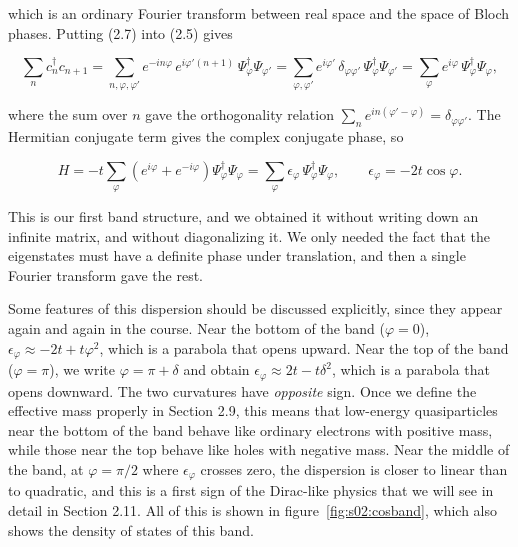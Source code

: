 which is an ordinary Fourier transform between real space and the space of Bloch phases. Putting (2.7) into (2.5) gives

\begin{equation*}\sum_n c_n^\dagger c_{n+1} = \sum_{n,\varphi,\varphi'} e^{-in\varphi}\,e^{i\varphi'(n+1)}\,
\Psi_\varphi^\dagger \Psi_{\varphi'} = \sum_{\varphi,\varphi'} e^{i\varphi'}\,\delta_{\varphi\varphi'}\,
\Psi_\varphi^\dagger\Psi_{\varphi'} = \sum_\varphi e^{i\varphi}\, \Psi_\varphi^\dagger\Psi_\varphi,\end{equation*}

where the sum over $n$ gave the orthogonality relation $\sum_n e^{in(\varphi'-\varphi)} =
\delta_{\varphi\varphi'}$. The Hermitian conjugate term gives the complex conjugate phase, so

\begin{equation}H = -t\sum_\varphi \left(e^{i\varphi}+e^{-i\varphi}\right)\Psi_\varphi^\dagger\Psi_\varphi
= \sum_\varphi \epsilon_\varphi\, \Psi_\varphi^\dagger\Psi_\varphi, \qquad
\boxed{\epsilon_\varphi = -2t\cos\varphi}.\end{equation}

This is our first band structure, and we obtained it without writing down an infinite matrix, and
without diagonalizing it. We only needed the fact that the eigenstates must have a definite phase
under translation, and then a single Fourier transform gave the rest.

Some features of this dispersion should be discussed explicitly, since they appear again and again
in the course. Near the bottom of the band ($\varphi=0$), $\epsilon_\varphi \approx -2t + t\varphi^2$,
which is a parabola that opens upward. Near the top of the band ($\varphi=\pi$), we write
$\varphi=\pi+\delta$ and obtain $\epsilon_\varphi\approx 2t-t\delta^2$, which is a parabola that opens
downward. The two curvatures have \emph{opposite} sign. Once we define the effective mass properly in
Section 2.9, this means that low-energy quasiparticles near the bottom of the band behave like
ordinary electrons with positive mass, while those near the top behave like holes with negative mass.
Near the middle of the band, at $\varphi=\pi/2$ where $\epsilon_\varphi$ crosses zero, the dispersion
is closer to linear than to quadratic, and this is a first sign of the Dirac-like physics that we will
see in detail in Section 2.11. All of this is shown in figure~\ref{fig:s02:cosband}, which also shows
the density of states of this band.



